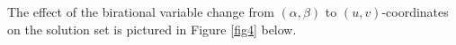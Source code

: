 \documentclass[12pt,letterpaper, reqno]{amsart}
\theoremstyle{definition}
\theoremstyle{remark}
\begin{document}
The effect of the birational variable change from $(\alpha, \beta)$ to $(u, v)$-coordinates
on the solution set is
pictured in Figure \ref{fig4} below.

\end{document}
